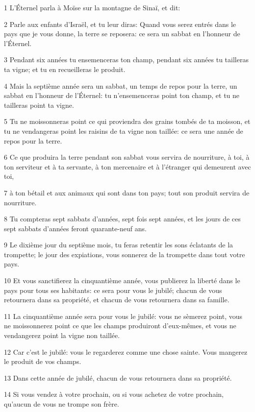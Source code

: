 \par 1 L'Éternel parla à Moïse sur la montagne de Sinaï, et dit:
\par 2 Parle aux enfants d'Israël, et tu leur diras: Quand vous serez entrés dans le pays que je vous donne, la terre se reposera: ce sera un sabbat en l'honneur de l'Éternel.
\par 3 Pendant six années tu ensemenceras ton champ, pendant six années tu tailleras ta vigne; et tu en recueilleras le produit.
\par 4 Mais la septième année sera un sabbat, un temps de repos pour la terre, un sabbat en l'honneur de l'Éternel: tu n'ensemenceras point ton champ, et tu ne tailleras point ta vigne.
\par 5 Tu ne moissonneras point ce qui proviendra des grains tombés de ta moisson, et tu ne vendangeras point les raisins de ta vigne non taillée: ce sera une année de repos pour la terre.
\par 6 Ce que produira la terre pendant son sabbat vous servira de nourriture, à toi, à ton serviteur et à ta servante, à ton mercenaire et à l'étranger qui demeurent avec toi,
\par 7 à ton bétail et aux animaux qui sont dans ton pays; tout son produit servira de nourriture.
\par 8 Tu compteras sept sabbats d'années, sept fois sept années, et les jours de ces sept sabbats d'années feront quarante-neuf ans.
\par 9 Le dixième jour du septième mois, tu feras retentir les sons éclatants de la trompette; le jour des expiations, vous sonnerez de la trompette dans tout votre pays.
\par 10 Et vous sanctifierez la cinquantième année, vous publierez la liberté dans le pays pour tous ses habitants: ce sera pour vous le jubilé; chacun de vous retournera dans sa propriété, et chacun de vous retournera dans sa famille.
\par 11 La cinquantième année sera pour vous le jubilé: vous ne sèmerez point, vous ne moissonnerez point ce que les champs produiront d'eux-mêmes, et vous ne vendangerez point la vigne non taillée.
\par 12 Car c'est le jubilé: vous le regarderez comme une chose sainte. Vous mangerez le produit de vos champs.
\par 13 Dans cette année de jubilé, chacun de vous retournera dans sa propriété.
\par 14 Si vous vendez à votre prochain, ou si vous achetez de votre prochain, qu'aucun de vous ne trompe son frère.
